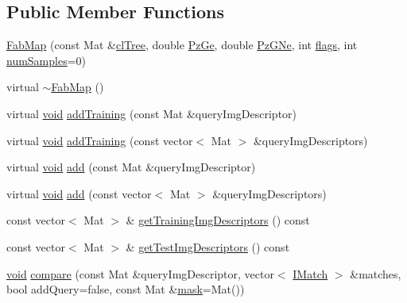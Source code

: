 \subsection*{Public Member Functions}
\begin{DoxyCompactItemize}
\item 
\hyperlink{classcv_1_1of2_1_1FabMap_abcc8ef1148831788f8e5944b60b76a7c}{Fab\-Map} (const Mat \&\hyperlink{classcv_1_1of2_1_1FabMap_a54e4331990e8069be69fec53b545c2bd}{cl\-Tree}, double \hyperlink{classcv_1_1of2_1_1FabMap_a0c79d4180f0ffe49bfbfe541b9981e7b}{Pz\-Ge}, double \hyperlink{classcv_1_1of2_1_1FabMap_a0bf851f305f6a00d5a837a7c70e40f3d}{Pz\-G\-Ne}, int \hyperlink{highgui__c_8h_ae51e3a2d4365e85db9630dd3ce9508db}{flags}, int \hyperlink{classcv_1_1of2_1_1FabMap_a023e2c53333bb5505baceb182011980f}{num\-Samples}=0)
\item 
virtual \hyperlink{classcv_1_1of2_1_1FabMap_ae2473a7aa06da27cf7e2e41ddf1da690}{$\sim$\-Fab\-Map} ()
\item 
virtual \hyperlink{legacy_8hpp_a8bb47f092d473522721002c86c13b94e}{void} \hyperlink{classcv_1_1of2_1_1FabMap_a67ceb39e607365e2666ed6fdc868d7e6}{add\-Training} (const Mat \&query\-Img\-Descriptor)
\item 
virtual \hyperlink{legacy_8hpp_a8bb47f092d473522721002c86c13b94e}{void} \hyperlink{classcv_1_1of2_1_1FabMap_a69e9945fc517537c7ab1013e164af81e}{add\-Training} (const vector$<$ Mat $>$ \&query\-Img\-Descriptors)
\item 
virtual \hyperlink{legacy_8hpp_a8bb47f092d473522721002c86c13b94e}{void} \hyperlink{classcv_1_1of2_1_1FabMap_aed744db44f2dec7506e366e3e851a60d}{add} (const Mat \&query\-Img\-Descriptor)
\item 
virtual \hyperlink{legacy_8hpp_a8bb47f092d473522721002c86c13b94e}{void} \hyperlink{classcv_1_1of2_1_1FabMap_a84d7adfd92ef5cfa2901d54164d3f6ac}{add} (const vector$<$ Mat $>$ \&query\-Img\-Descriptors)
\item 
const vector$<$ Mat $>$ \& \hyperlink{classcv_1_1of2_1_1FabMap_ab431c7975678ff293f6c4a83dc5826e9}{get\-Training\-Img\-Descriptors} () const 
\item 
const vector$<$ Mat $>$ \& \hyperlink{classcv_1_1of2_1_1FabMap_a62a2591ddfed7161b7eae39308112d49}{get\-Test\-Img\-Descriptors} () const 
\item 
\hyperlink{legacy_8hpp_a8bb47f092d473522721002c86c13b94e}{void} \hyperlink{classcv_1_1of2_1_1FabMap_a6e37569004c4fe6db48129a56abe700a}{compare} (const Mat \&query\-Img\-Descriptor, vector$<$ \hyperlink{structcv_1_1of2_1_1IMatch}{I\-Match} $>$ \&matches, bool add\-Query=false, const Mat \&\hyperlink{tracking_8hpp_a6b13ecd2fd6ec7ad422f1d7863c3ad19}{mask}=Mat())

\end{DoxyCompactItemize}
